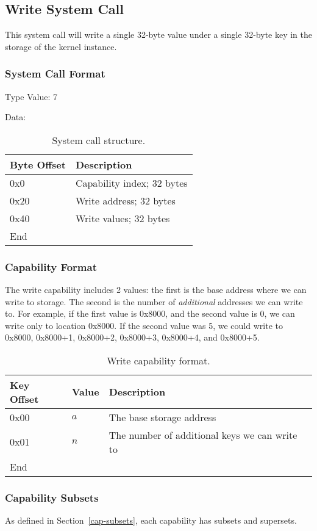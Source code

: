 \documentclass[english,a4paper]{article}
\let\oldparagraph\subsubsection
\renewcommand{\subsubsection}[1]{\oldparagraph{#1}\mbox{}}
\begin{document}
\subsection{Write System Call}
This system call will write a single 32-byte value under a single 32-byte key in
the storage of the kernel instance.

\subsubsection{System Call Format}
Type Value: 7

Data:

\begin{table}[H]
  \caption{System call structure.}
  \centering{}%
  \begin{tabular}{l|p{}}
    \hline
    Byte Offset & Description\tabularnewline
    \hline
    \hline
    0x0 & Capability index; 32 bytes \tabularnewline
    0x20 & Write address; 32 bytes \tabularnewline
    0x40 & Write values; 32 bytes \tabularnewline
    \hline
    End &  \tabularnewline
    \hline
  \end{tabular}
\end{table}

\subsubsection{Capability Format}
The write capability includes 2 values: the first is the base address where we
can write to storage. The second is the number of \emph{additional} addresses we
can write to. For example, if the first value is 0x8000, and the second value is
0, we can write only to location 0x8000. If the second value was 5, we could
write to 0x8000, 0x8000+1, 0x8000+2, 0x8000+3, 0x8000+4, and 0x8000+5.

\begin{table}[H]
  \caption{Write capability format.}
  \centering{}%
  \begin{tabular}{l|l|p{}}
    \hline
    Key Offset & Value & Description\tabularnewline
    \hline
    \hline
    0x00 & $a$ & The base storage address\tabularnewline
    0x01 & $n$ & The number of additional keys we can write to\tabularnewline
    \hline
    End &  \tabularnewline
    \hline
  \end{tabular}
\end{table}

\subsubsection{Capability Subsets}
As defined in Section~\ref{cap-subsets}, each capability has subsets and
supersets.
\end{document}
